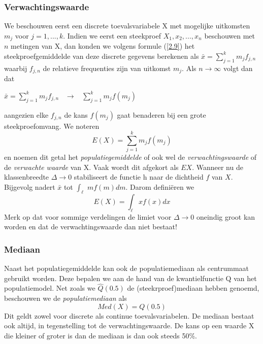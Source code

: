 \documentclass[titlepage]{article}
\numberwithin{equation}{section}
\begin{document}
 \subsubsection{Verwachtingswaarde}
 We beschouwen eerst een discrete toevalsvariabele X met mogelijke uitkomsten $m_j$ voor $j=1, ... , k$. Indien we eerst een steekproef $X_1, x_2, ... , x_n$ beschouwen met $n$ metingen van X, dan konden we volgens formule (\ref{2.9}) het steekproefgemiddelde van deze discrete gegevens berekenen als $\bar{x}=\sum_{j=1}^k m_jf_{j,n}$ waarbij $f_{j,n}$ de relatieve frequenties zijn van uitkomst $m_j$. Als $n\rightarrow \infty$ volgt dan dat
 \begin{center}
 	$\bar{x} = \sum\limits_{j=1}^k m_j f_{j,n}$ \ $\rightarrow$ \ $\sum\limits_{j=1}^k m_j f(m_j)$
 \end{center}
 aangezien elke $f_{j,n}$ de kans $f(m_j)$ gaat benaderen bij een grote steekproefomvang. We noteren
 \begin{equation}
 	E(X) = \sum\limits_{j=1}^k m_j f(m_j)
 	\label{3.21}
 \end{equation}
 en noemen dit getal het \textit{populatiegemiddelde} of ook wel de \textit{verwachtingswaarde} of de \textit{verwachte waarde} van X. Vaak wordt dit afgekort als $EX$.\newline\newline
 Wanneer nu de klassenbreedte $\Delta \rightarrow 0$ stabiliseert de functie h naar de dichtheid $f$ van $X$. Bijgevolg nadert $\bar{x}$ tot $\int_\ell$ $mf(m)dm$. Darom definiëren we
 \begin{equation}
 	E(X)=\int_\ell x f(x) dx
 	\label{3.22}
 \end{equation}
 \danger Merk op dat voor sommige verdelingen de limiet voor $\Delta \rightarrow 0$ oneindig groot kan worden en dat de verwachtingswaarde dan niet bestaat!
 \subsubsection{Mediaan}
 Naast het populatiegemiddelde kan ook de populatiemediaan als centrummaat gebruikt worden. Deze bepalen we aan de hand van de kwantielfunctie Q van het populatiemodel. Net zoals we $\hat{Q}(0.5)$ de (steekrproef)mediaan hebben genoemd, beschouwen we de \textit{populatiemediaan} als
 \begin{equation}
 	Med(X) = Q(0.5)
 	\label{3.23}
 \end{equation}
 Dit geldt zowel voor discrete als continue toevalsvariabelen. De mediaan bestaat ook altijd, in tegenstelling tot de verwachtingswaarde. De kans op een waarde X die kleiner of groter is dan de mediaan is dan ook steeds 50\%.
\end{document}

